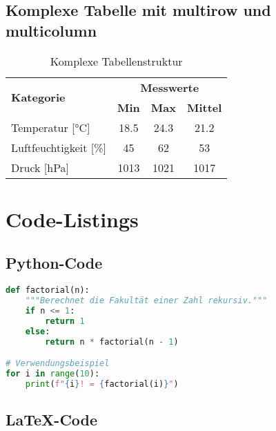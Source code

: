\subsection{Komplexe Tabelle mit multirow und multicolumn}
\label{subsec:komplexe_tabelle}

\begin{table}[h]
	\centering
	\caption{Komplexe Tabellenstruktur}
	\label{tab:komplex}
	\begin{tabular}{|l|c|c|c|}
		\hline
		\multirow{2}{*}{\textbf{Kategorie}} & \multicolumn{3}{c|}{\textbf{Messwerte}}                                  \\
		\cline{2-4}
		                                    & \textbf{Min}                            & \textbf{Max} & \textbf{Mittel} \\
		\hline
		Temperatur [°C]                     & 18.5                                    & 24.3         & 21.2            \\
		Luftfeuchtigkeit [\%]               & 45                                      & 62           & 53              \\
		Druck [hPa]                         & 1013                                    & 1021         & 1017            \\
		\hline
	\end{tabular}
\end{table}

\section{Code-Listings}
\label{sec:code_listings}

\subsection{Python-Code}
\label{subsec:python_code}

\begin{lstlisting}[caption={Python-Beispiel: Fakultätsfunktion},label={lst:python_factorial},language=Python]
def factorial(n):
    """Berechnet die Fakultät einer Zahl rekursiv."""
    if n <= 1:
        return 1
    else:
        return n * factorial(n - 1)

# Verwendungsbeispiel
for i in range(10):
    print(f"{i}! = {factorial(i)}")
\end{lstlisting}

\subsection{LaTeX-Code}
\label{subsec:latex_code}

